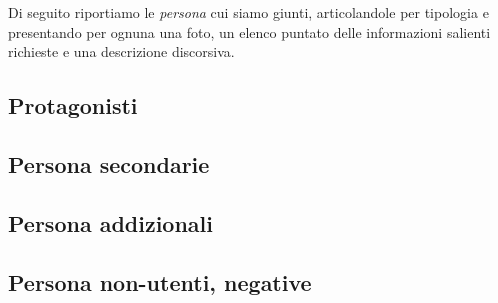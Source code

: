 \noindent
Di seguito riportiamo le \textit{persona} cui siamo giunti, articolandole per tipologia e presentando per ognuna una foto, un elenco puntato delle informazioni salienti richieste e una descrizione discorsiva.

\subsection{Protagonisti}
\label{ss:protagonisti}







\subsection{Persona secondarie}
\label{ss:persona-secondaria}



\subsection{Persona addizionali}
\label{ss:persona-addizional}



\subsection{Persona non-utenti, negative}
\label{ss:persona-negative}

